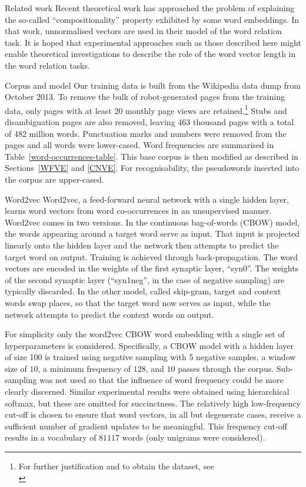 \documentclass{article} %
\begin{document}
\begin{section}{Related work}
Recent theoretical work \cite{Arora2015} has approached the problem of
explaining the so-called ``compositionality'' property exhibited by some word
embeddings.  In that work, unnormalised vectors are used in their model of the
word relation task.  It is hoped that experimental approaches such as those
described here might enable theoretical investigations to describe the role of
the word vector length in the word relation tasks.  \end{section}

\begin{section}{Corpus and model}\label{corpus-and-model} Our training data is
	built from the Wikipedia data dump from October 2013.  To remove the
	bulk of robot-generated pages from the training data, only pages with
	at least 20 monthly page views are retained.\footnote{For further
	justification and to obtain the dataset, see\\ \blogpost} Stubs and
	disambiguation pages are also removed, leaving 463 thousand pages with
	a total of 482 million words.  Punctuation marks and numbers were
	removed from the pages and all words were lower-cased.  Word
	frequencies are summarised in Table~\ref{word-occurrences-table}.  This
	base corpus is then modified as described in Sections~\ref{WFVE} and
	\ref{CNVE}.  For recognisability, the pseudowords inserted into the
	corpus are upper-cased.

\begin{subsection}{Word2vec}\label{word2vec} Word2vec, a feed-forward neural
	network with a single hidden layer, learns word vectors from word
	co-occurrences in an unsupervised manner.  Word2vec comes in two
	versions.  In the continuous bag-of-words (CBOW) model, the words
	appearing around a target word serve as input.  That input is projected
	linearly onto the hidden layer and the network then attempts to predict
	the target word on output.  Training is achieved through
	back-propagation.  The word vectors are encoded in the weights of the
	first synaptic layer, ``syn0''.  The weights of the second synaptic
	layer (``syn1neg'', in the case of negative sampling) are typically
	discarded.  In the other model, called skip-gram, target and context
	words swap places, so that the target word now serves as input, while
	the network attempts to predict the context words on output.

For simplicity only the word2vec CBOW word embedding with a single set of
hyperparameters is considered.  Specifically, a CBOW model with a hidden layer
of size 100 is trained using negative sampling with 5 negative samples, a
window size of $10$, a minimum frequency of $128$, and $10$ passes through the
corpus.  Sub-sampling was not used so that the influence of word frequency
could be more clearly discerned.  Similar experimental results were obtained
using hierarchical softmax, but these are omitted for succinctness.  The
relatively high low-frequency cut-off is chosen to ensure that word vectors, in
all but degenerate cases, receive a sufficient number of gradient updates to be
meaningful.  This frequency cut-off results in a vocabulary of $81117$ words
(only unigrams were considered).


\end{subsection}
\end{section}
\end{document}
